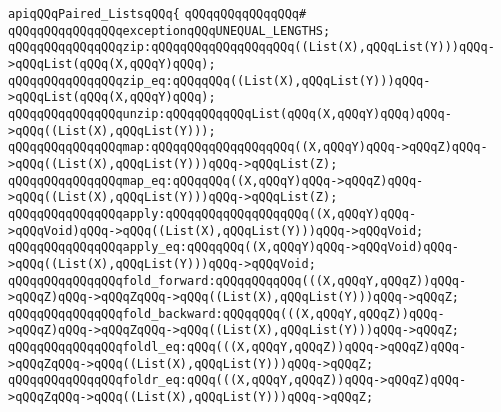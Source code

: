 \newline
\newline
\newline
\newline
\verb|apiqQQqPaired_ListsqQQq{|\newline
\verb|qQQqqQQqqQQqqQQq#|\newline
\verb|qQQqqQQqqQQqqQQqexceptionqQQqUNEQUAL_LENGTHS;|\newline
\newline
\verb|qQQqqQQqqQQqqQQqzip:qQQqqQQqqQQqqQQqqQQq((List(X),qQQqList(Y)))qQQq->qQQqList(qQQq(X,qQQqY)qQQq);|\newline
\verb|qQQqqQQqqQQqqQQqzip_eq:qQQqqQQq((List(X),qQQqList(Y)))qQQq->qQQqList(qQQq(X,qQQqY)qQQq);|\newline
\newline
\verb|qQQqqQQqqQQqqQQqunzip:qQQqqQQqqQQqList(qQQq(X,qQQqY)qQQq)qQQq->qQQq((List(X),qQQqList(Y)));|\newline
\newline
\verb|qQQqqQQqqQQqqQQqmap:qQQqqQQqqQQqqQQqqQQq((X,qQQqY)qQQq->qQQqZ)qQQq->qQQq((List(X),qQQqList(Y)))qQQq->qQQqList(Z);|\newline
\verb|qQQqqQQqqQQqqQQqmap_eq:qQQqqQQq((X,qQQqY)qQQq->qQQqZ)qQQq->qQQq((List(X),qQQqList(Y)))qQQq->qQQqList(Z);|\newline
\newline
\verb|qQQqqQQqqQQqqQQqapply:qQQqqQQqqQQqqQQqqQQq((X,qQQqY)qQQq->qQQqVoid)qQQq->qQQq((List(X),qQQqList(Y)))qQQq->qQQqVoid;|\newline
\verb|qQQqqQQqqQQqqQQqapply_eq:qQQqqQQq((X,qQQqY)qQQq->qQQqVoid)qQQq->qQQq((List(X),qQQqList(Y)))qQQq->qQQqVoid;|\newline
\newline
\verb|qQQqqQQqqQQqqQQqfold_forward:qQQqqQQqqQQq(((X,qQQqY,qQQqZ))qQQq->qQQqZ)qQQq->qQQqZqQQq->qQQq((List(X),qQQqList(Y)))qQQq->qQQqZ;|\newline
\verb|qQQqqQQqqQQqqQQqfold_backward:qQQqqQQq(((X,qQQqY,qQQqZ))qQQq->qQQqZ)qQQq->qQQqZqQQq->qQQq((List(X),qQQqList(Y)))qQQq->qQQqZ;|\newline
\newline
\verb|qQQqqQQqqQQqqQQqfoldl_eq:qQQq(((X,qQQqY,qQQqZ))qQQq->qQQqZ)qQQq->qQQqZqQQq->qQQq((List(X),qQQqList(Y)))qQQq->qQQqZ;|\newline
\verb|qQQqqQQqqQQqqQQqfoldr_eq:qQQq(((X,qQQqY,qQQqZ))qQQq->qQQqZ)qQQq->qQQqZqQQq->qQQq((List(X),qQQqList(Y)))qQQq->qQQqZ;|\newline
\newline
